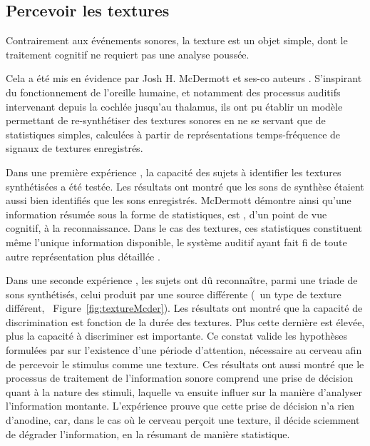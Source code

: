 \subsection{Percevoir les textures}
\label{sec:ch3_texturePerception}

Contrairement aux événements sonores, la texture est un objet simple, dont le traitement cognitif ne requiert pas une analyse poussée. 

Cela a été mis en évidence par Josh H. McDermott et ses-co auteurs \citep{mcdermott2011sound,mcdermott2013summary}. S'inspirant du fonctionnement de l'oreille humaine, et notamment des processus auditifs intervenant depuis la cochlée jusqu'au thalamus, ils ont pu établir un modèle permettant de re-synthétiser des textures sonores en ne se servant que de statistiques simples, calculées à partir de représentations temps-fréquence de signaux de textures enregistrés. 

Dans une première expérience \citep{mcdermott2011sound}, la capacité des sujets à identifier les textures synthétisées a été testée. Les résultats ont montré que les sons de synthèse étaient aussi bien identifiés que les sons enregistrés. McDermott démontre ainsi qu'une information résumée sous la forme de statistiques, est , d'un point de vue cognitif, à la reconnaissance. Dans le cas des textures, ces statistiques constituent même l'unique information disponible, le système auditif ayant fait fi de toute autre représentation plus détaillée \citep{nelken2013ear}.

Dans une seconde expérience \citep{mcdermott2013summary}, les sujets ont dû reconnaître, parmi une triade de sons synthétisés, celui produit par une source différente (\ie~un type de texture différent, \cf~Figure~\ref{fig:textureMcder}). Les résultats ont montré que la capacité de discrimination est fonction de la durée des textures. Plus cette dernière est élevée, plus la capacité à discriminer est importante. Ce constat valide les hypothèses formulées par \citep{saint1995classification} sur l'existence d'une période d'attention, nécessaire au cerveau afin de percevoir le stimulus comme une texture. Ces résultats ont aussi montré que le processus de traitement de l'information sonore comprend une prise de décision quant à la nature des stimuli, laquelle va ensuite influer sur la manière d'analyser l'information montante. L'expérience prouve que cette prise de décision n'a rien d'anodine, car, dans le cas où le cerveau perçoit une texture, il décide sciemment de dégrader l'information, en la résumant de manière statistique.

